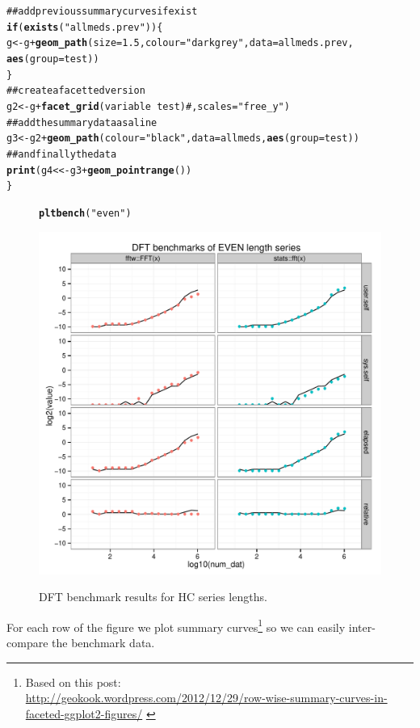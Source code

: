 \documentclass[12pt]{article}\usepackage{graphicx, color}
\makeatletter
\newcommand{\hlfunctioncall}[1]{\textcolor[rgb]{0.501960784313725,0,0.329411764705882}{\textbf{#1}}}%
\newcommand{\hlstring}[1]{\textcolor[rgb]{0.6,0.6,1}{#1}}%
\newcommand{\hlcomment}[1]{\textcolor[rgb]{0.180392156862745,0.6,0.341176470588235}{#1}}%
\newenvironment{kframe}{%
 \def\at@end@of@kframe{}%
 \ifinner\ifhmode%
  \def\at@end@of@kframe{\end{minipage}}%
  \begin{minipage}{\columnwidth}%
 \fi\fi%
 \def\FrameCommand##1{\hskip\@totalleftmargin \hskip-\fboxsep
 \colorbox{shadecolor}{##1}\hskip-\fboxsep
     \hskip-\linewidth \hskip-\@totalleftmargin \hskip\columnwidth}%
 \MakeFramed {\advance\hsize-\width
   \@totalleftmargin\z@ \linewidth\hsize
   \@setminipage}}%
 {\par\unskip\endMakeFramed%
 \at@end@of@kframe}
\newenvironment{knitrout}{}{} %
\makeatother
\begin{document}
\begin{knitrout}
\begin{kframe}
\begin{alltt}
\hlcomment{  ## add previous summary curves if exist}
  \hlfunctioncall{if} (\hlfunctioncall{exists}(\hlstring{"allmeds.prev"}))\{
     g <- g + \hlfunctioncall{geom_path}(size=1.5, colour=\hlstring{"dark grey"}, data=allmeds.prev, 
                        \hlfunctioncall{aes}(group=test))
                        \}
\hlcomment{  ## create a facetted version}
  g2 <- g + \hlfunctioncall{facet_grid}(variable~test) #, scales=\hlstring{"free_y"})
\hlcomment{  ## add the summary data as a line}
  g3 <- g2 + \hlfunctioncall{geom_path}(colour=\hlstring{"black"}, data=allmeds, \hlfunctioncall{aes}(group=test))
\hlcomment{  ## and finally the data}
  \hlfunctioncall{print}(g4 <<- g3 + \hlfunctioncall{geom_pointrange}())
\}
\end{alltt}
\end{kframe}
\end{knitrout}


\begin{figure}[htb!]
\begin{center}
\begin{knitrout}
\color{fgcolor}\begin{kframe}
\begin{alltt}
\hlfunctioncall{pltbench}(\hlstring{"even"})
\end{alltt}
\end{kframe}
\end{knitrout}

\includegraphics[width=\textwidth]{fftw_bench_even}
\label{fig:even}
\caption{DFT benchmark results for HC series lengths.}
\end{center}
\end{figure}
For each row of the figure we plot summary curves\footnote{
Based on this post:\\
{\small
\url{http://geokook.wordpress.com/2012/12/29/row-wise-summary-curves-in-faceted-ggplot2-figures/}
}
} so we can easily inter-compare the benchmark data.
\end{document}
